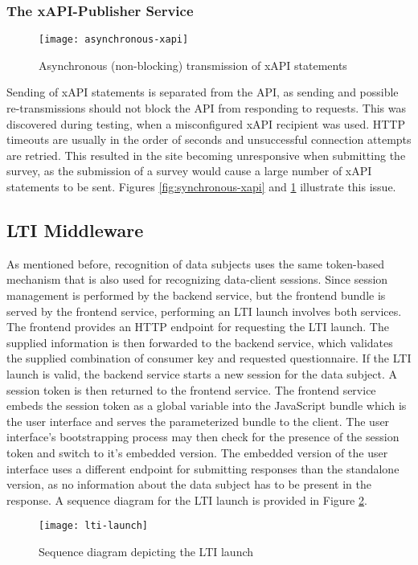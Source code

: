     \subsubsection{The xAPI-Publisher Service}

        \begin{figure}
            \centering
            \texttt{[image: asynchronous-xapi]}
            \caption{Asynchronous (non-blocking) transmission of xAPI statements}
            \label{fig:asynchronous-xapi}
        \end{figure}

        Sending of xAPI statements is separated from the API, as sending and
        possible re-transmissions should not block the API from responding
        to requests. This was discovered during testing, when a misconfigured xAPI
        recipient was used. HTTP timeouts are usually in the order of seconds and 
        unsuccessful connection attempts are retried. This resulted in
        the site becoming unresponsive when submitting the survey, as the submission
        of a survey would cause a large number of xAPI statements to be sent.
        Figures \ref{fig:synchronous-xapi} and \ref{fig:asynchronous-xapi} illustrate
        this issue.

\subsection{LTI Middleware}
    As mentioned before, recognition of data subjects uses the same token-based
    mechanism that is also used for recognizing data-client sessions.
    Since session management is performed by the backend service,
    but the frontend bundle is served by the frontend service, performing
    an LTI launch involves both services. The frontend provides an HTTP
    endpoint for requesting the LTI launch. The supplied information
    is then forwarded to the backend service, which validates
    the supplied combination of consumer key and requested questionnaire.
    If the LTI launch is valid, the backend service starts a new session
    for the data subject. A session token is then returned to the frontend
    service. The frontend service embeds the session token as a global
    variable into the JavaScript bundle which is the user interface and
    serves the parameterized bundle to the client.
    The user interface's bootstrapping process may then check for
    the presence of the session token and switch to it's embedded version.
    The embedded version of the user interface uses a different endpoint
    for submitting responses than the standalone version, as no information
    about the data subject has to be present in the response.
    A sequence diagram for the LTI launch is provided in Figure \ref{fig:lti-launch}.

    \begin{figure}
        \centering
        \texttt{[image: lti-launch]}
        \caption{Sequence diagram depicting the LTI launch}
        \label{fig:lti-launch}
    \end{figure}
    
